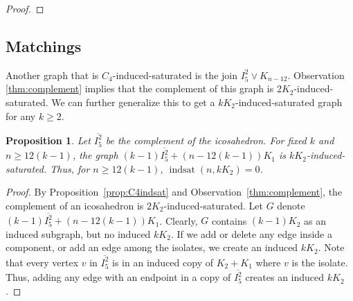 \documentclass[12pt]{amsart}
\theoremstyle{plain}
\newtheorem{prop}[thm]{Proposition}
\theoremstyle{definition}
\theoremstyle{remark}
\newcommand{\indsat}[2]{\ensuremath{\operatorname{indsat}(#1,#2)}\xspace}
\renewcommand{\bar}{\overline}
\begin{document}
\begin{proof}
\end{proof}

\subsection{Matchings}
Another graph that is $C_4$-induced-saturated is the join $I_5^2 \vee K_{n-12}$.
Observation \ref{thm:complement} implies that the complement of this graph is $2K_2$-induced-saturated. We can further generalize this to get a $kK_2$-induced-saturated graph for any $k\geq 2$.

\begin{prop}\label{clm:match}
Let $\overline{I_5^2}$ be the complement of the icosahedron. For fixed $k$ and $n \geq 12(k-1)$, the graph $(k-1)\overline{I_5^2} + (n-12(k-1))K_1$ is $kK_2$-induced-saturated. Thus, for $n \geq 12(k-1)$, $\indsat{n}{kK_2}=0$.
\end{prop}
\begin{proof}
By Proposition~\ref{prop:C4indsat} and Observation~\ref{thm:complement}, the complement of an icosahedron is $2K_2$-induced-saturated. Let $G$ denote $(k-1)\bar{I_5^2} + (n - 12(k - 1))K_1$.  Clearly, $G$ contains $(k-1)K_2$ as an induced subgraph, but no induced $kK_2$.  If we add or delete any edge inside a component, or add an edge among the isolates, we create an induced $kK_2$. Note that every vertex $v$ in $\bar{I_5^2}$ is in an induced copy of $K_2+K_1$ where $v$ is the isolate.  Thus, adding any edge with an endpoint in a copy of $\bar{I_5^2}$ creates an induced $kK_2$.
\end{proof}
\end{document}
